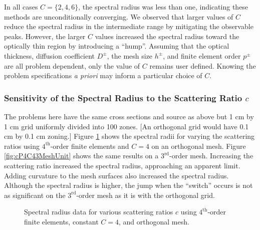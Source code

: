 \documentclass[12pt]{article}
\begin{document}
\FloatBarrier

In all cases $C=\{2,4,6\}$, the spectral radius was less than one, indicating these methods are unconditionally converging. We observed that larger values of $C$ reduce the spectral radius in the intermediate range by mitigating the observable peaks. However, the larger $C$ values increased the spectral radius toward the optically thin region by introducing a ``hump''. Assuming that the optical thickness, diffusion coefficient $D^\pm$, the mesh size $h^\pm$, and finite element order $p^\pm$ are all problem dependent, only the value of $C$ remains user defined. Knowing the problem specifications {\em a priori} may inform a particular choice of $C$.

\subsubsection{Sensitivity of the Spectral Radius to the Scattering Ratio $c$}
The problems here have the same cross sections and source as above but 1 cm by 1 cm grid uniformly divided into 100 zones. [An orthogonal grid would have 0.1 cm by 0.1 cm zoning.] Figure \ref{fig:cP4C4OrthoUnit} shows the spectral radii for varying the scattering ratios using $4^\text{th}$-order finite elements and $C=4$ on an orthogonal mesh. Figure \ref{fig:cP4C43MeshUnit} shows the same results on a $3^\text{rd}$-order mesh. Increasing the scattering ratio increased the spectral radius, approaching an apparent limit. Adding curvature to the mesh surfaces also increased the spectral radius. Although the spectral radius is higher, the jump when the ``switch'' occurs is not as significant on the $3^\text{rd}$-order mesh as it is with the orthogonal grid.

\begin{figure}[!htb]
\centering
{}
\caption{Spectral radius data for various scattering ratios $c$ using $4^\text{th}$-order finite elements, constant $C=4$, and orthogonal mesh.}
\label{fig:cP4C4OrthoUnit}
\end{figure}
\end{document}
